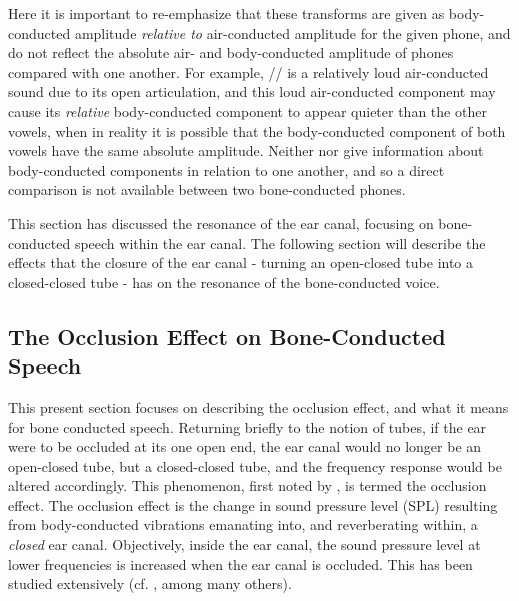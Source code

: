 Here it is important to re-emphasize that these transforms are given as body-conducted amplitude \textit{relative to} air-conducted amplitude for the given phone, and do not reflect the absolute air- and body-conducted amplitude of phones compared with one another.  For example, // is a relatively loud air-conducted sound due to its open articulation, and this loud air-conducted component may cause its \textit{relative} body-conducted component to appear quieter than the other vowels, when in reality it is possible that the body-conducted component of both vowels have the same absolute amplitude.  Neither \cite{bekesy:60} nor \cite{reinfeldt:10} give information about body-conducted components in relation to one another, and so a direct comparison is not available between two bone-conducted phones.

This section has discussed the resonance of the ear canal, focusing on bone-conducted speech within the ear canal.  The following section will describe the effects that the closure of the ear canal - turning an open-closed tube into a closed-closed tube - has on the resonance of the bone-conducted voice.


\subsection{The Occlusion Effect on Bone-Conducted Speech}\label{sec:OEBCspeech}



This present section focuses on describing the occlusion effect, and what it means for bone conducted speech.  Returning briefly to the notion of tubes, if the ear were to be occluded at its one open end, the ear canal would no longer be an open-closed tube, but a closed-closed tube, and the frequency response would be altered accordingly.  This phenomenon, first noted by \cite{wheatstone:79}, is termed the occlusion effect.  The occlusion effect is the change in sound pressure level (SPL) resulting from body-conducted vibrations emanating into, and reverberating within, a \textit{closed} ear canal.  Objectively, inside the ear canal, the sound pressure level at lower frequencies is increased when the ear canal is occluded.  This has been studied extensively (cf. \cite{wheatstone:79,kelly:37,littler:52,tonndorf:66}, among many others).  %

